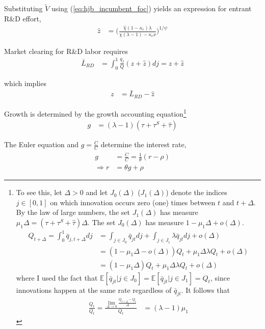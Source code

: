 \documentclass[11pt,english]{article}
\theoremstyle{remark}
\begin{document}
Substituting $\tilde{V}$ using (\ref{eq:hjb_incumbent_foc}) yields an expression for entrant R\&D effort, 
\begin{align}
	\hat{z} &= \Big( \frac{\hat{\chi} (1-\kappa_{e}) \lambda}{\chi(\lambda-1) - \kappa_c \nu } \Big)^{1/\psi} \label{eq:effort_entrant}
\end{align}

Market clearing for R\&D labor requires
\begin{align}
	\bar{L}_{RD} &= \int_0^1 \frac{q_j}{Q} (z + \hat{z}) dj = z + \hat{z}
\end{align}
 
which implies
\begin{align}
	z &= \bar{L}_{RD} - \hat{z} \label{eq:zI_asFuncZe}
\end{align}

Growth is determined by the growth accounting equation\footnote{To see this, let $\Delta > 0$ and let $J_0(\Delta)$ ($J_1(\Delta)$) denote the indices $j\in [0,1]$ on which innovation occurs zero (one) times between $t$ and $t+\Delta$. By the law of large numbers, the set $J_1(\Delta)$ has measure $\mu_1 \Delta = (\tau + \tau^S + \hat{\tau})\Delta$. The set $J_0(\Delta)$ has measure $1 - \mu_1 \Delta + o(\Delta)$. 
		\begin{align*}
			Q_{t+\Delta} = \int_0^1 \bar{q}_{j,t+\Delta} dj &= \int_{j \in J_0} \bar{q}_{jt} dj + \int_{j \in J_1} \lambda \bar{q}_{jt} dj + o(\Delta) \\
			&= (1 - \mu_1\Delta - o(\Delta)) Q_t + \mu_1 \Delta \lambda Q_t + o(\Delta) \\
			&= (1 - \mu_1\Delta) Q_t + \mu_1\Delta \lambda Q_t + o(\Delta)
 	\end{align*}
 where I used the fact that $\mathbb{E}[\bar{q}_{jt} | j \in J_0]  = \mathbb{E}[\bar{q}_{jt} | j \in J_1] = Q_t$, since innovations happen at the same rate regardless of $\bar{q}_{jt}$. It follows that
\begin{align*}
	\frac{\dot{Q}_t}{Q_t} = \frac{\lim_{\Delta \to 0} \frac{Q_{t+\Delta} - Q_t}{\Delta}}{Q_t} &= (\lambda - 1)\mu_1 
	\end{align*}}
\begin{align}
g &= (\lambda - 1)(\tau + \tau^S + \hat{\tau}) \label{eq:growth_accounting}
\end{align}

The Euler equation and $g = \frac{\dot{C}}{C}$ determine the interest rate, 
\begin{align}
	g &= \frac{\dot{C}}{C} = \frac{1}{\theta} (r - \rho) \label{eq:euler} \\
	\Rightarrow r &= \theta g + \rho \nonumber
\end{align}
\end{document}
